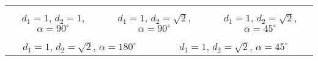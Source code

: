 \documentclass{standalone}
\begin{document}
\begin{tabular}{cccccc}
  \multicolumn{2}{c}{} &
  \multicolumn{2}{c}{} &
  \multicolumn{2}{c}{}\\
  \multicolumn{2}{c}{$d_1 = 1$, $d_2 = 1$, $\alpha = 90^{\circ}$} &
  \multicolumn{2}{c}{$d_1 = 1$, $d_2 = \sqrt{2}$, $\alpha = 90^{\circ}$} &
  \multicolumn{2}{c}{$d_1 = 1$, $d_2 = \sqrt{2}$, $\alpha = 45^{\circ}$}\\
  \multicolumn{3}{c}{\hspace{44pt}} &
  \multicolumn{3}{c}{\hspace{8pt}}\\
  \multicolumn{3}{c}{\hspace{44pt}$d_1 = 1$, $d_2 = \sqrt{2}$, $\alpha = 180^{\circ}$} &
  \multicolumn{3}{c}{\hspace{8pt}$d_1 = 1$, $d_2 = \sqrt{2}$, $\alpha = 45^{\circ}$}
\end{tabular}
\end{document}
